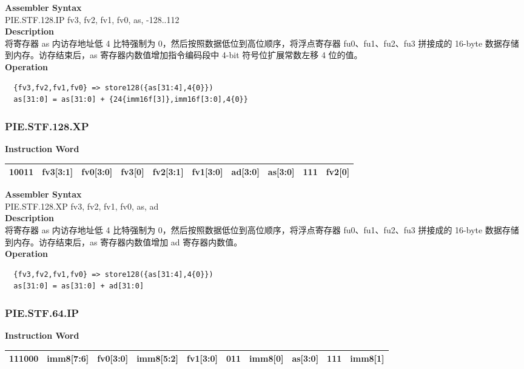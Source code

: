 \textbf{Assembler Syntax} \\
PIE.STF.128.IP fv3, fv2, fv1, fv0, as, -128..112 \\
\textbf{Description} \\
将寄存器 as 内访存地址低 4 比特强制为 0，然后按照数据低位到高位顺序，将浮点寄存器 fu0、fu1、fu2、fu3 拼接成的 16-byte 数据存储到内存。访存结束后，as 寄存器内数值增加指令编码段中 4-bit 符号位扩展常数左移 4 位的值。\\
\textbf{Operation}
\begin{lstlisting}
  {fv3,fv2,fv1,fv0} => store128({as[31:4],4{0}})
  as[31:0] = as[31:0] + {24{imm16f[3]},imm16f[3:0],4{0}}
\end{lstlisting}

\newpage
\subsubsection{PIE.STF.128.XP}\label{instruction:PIESTF128XP}
\setlength\tabcolsep{6pt}
\textbf{Instruction Word} \\
\begin{tabular}{|c|c|c|c|c|c|c|c|c|c|}
	\hline
	10011 & fv3[3:1] & fv0[3:0] & fv3[0] & fv2[3:1] & fv1[3:0] & ad[3:0] & as[3:0] & 111 & fv2[0] \\
	\hline
\end{tabular}

\textbf{Assembler Syntax} \\
PIE.STF.128.XP fv3, fv2, fv1, fv0, as, ad \\
\textbf{Description} \\
将寄存器 as 内访存地址低 4 比特强制为 0，然后按照数据低位到高位顺序，将浮点寄存器 fu0、fu1、fu2、fu3 拼接成的 16-byte 数据存储到内存。访存结束后，as 寄存器内数值增加 ad 寄存器内数值。\\
\textbf{Operation}
\begin{lstlisting}
  {fv3,fv2,fv1,fv0} => store128({as[31:4],4{0}})
  as[31:0] = as[31:0] + ad[31:0]
\end{lstlisting}

\newpage
\subsubsection{PIE.STF.64.IP}\label{instruction:PIESTF64IP}
\setlength\tabcolsep{6pt}
\textbf{Instruction Word} \\
\begin{tabular}{|c|c|c|c|c|c|c|c|c|c|}
	\hline
	111000 & imm8[7:6] & fv0[3:0] & imm8[5:2] & fv1[3:0] & 011 & imm8[0] & as[3:0] & 111 & imm8[1] \\
	\hline
\end{tabular}

